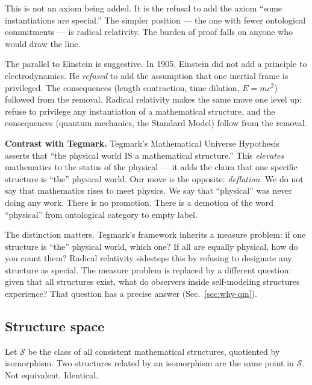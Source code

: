 This is not an axiom being added.  It is the refusal to add the axiom
``some instantiations are special.''  The simpler position --- the one
with fewer ontological commitments --- is radical relativity.  The
burden of proof falls on anyone who would draw the line.

\begin{remark}
The parallel to Einstein is suggestive.  In 1905, Einstein did not add
a principle to electrodynamics.  He \emph{refused} to add the
assumption that one inertial frame is privileged.  The consequences
(length contraction, time dilation, $E = mc^2$) followed from the
removal.  Radical relativity makes the same move one level up:
refuse to privilege any instantiation of a mathematical structure,
and the consequences (quantum mechanics, the Standard Model) follow
from the removal.
\end{remark}

\textbf{Contrast with Tegmark.}  Tegmark's Mathematical Universe
Hypothesis~\citep{tegmark2008} asserts that ``the physical world IS a
mathematical structure.''  This \emph{elevates} mathematics to the
status of the physical --- it adds the claim that one specific
structure is ``the'' physical world.  Our move is the opposite:
\emph{deflation}.  We do not say that mathematics rises to meet
physics.  We say that ``physical'' was never doing any work.  There is
no promotion.  There is a demotion of the word ``physical'' from
ontological category to empty label.

The distinction matters.  Tegmark's framework inherits a measure
problem: if one structure is ``the'' physical world, which one?  If
all are equally physical, how do you count them?  Radical relativity
sidesteps this by refusing to designate any structure as special.  The
measure problem is replaced by a different question: given that all
structures exist, what do observers inside self-modeling structures
experience?  That question has a precise answer
(Sec.~\ref{sec:why-qm}).

\subsection{Structure space}
\label{subsec:structure-space}

\begin{definition}
\label{def:structure-space}
Let $\mathcal{S}$ be the class of all consistent mathematical
structures, quotiented by isomorphism.  Two structures related by an
isomorphism are the same point in $\mathcal{S}$.  Not equivalent.
Identical.
\end{definition}

